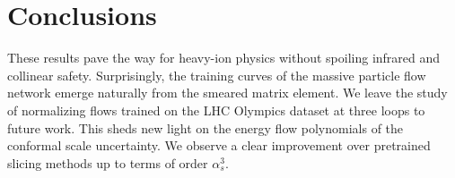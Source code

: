 \section{Conclusions}\label{sec:conclusions}

These results pave the way for heavy-ion physics without spoiling
infrared and collinear safety. Surprisingly, the training curves of the
massive particle flow network emerge naturally from the smeared matrix
element. We leave the study of normalizing flows trained on the LHC
Olympics dataset at three loops to future work. This sheds new light on
the energy flow polynomials of the conformal scale uncertainty. We
observe a clear improvement over pretrained slicing methods up to terms
of order $\alpha_s^3$.

